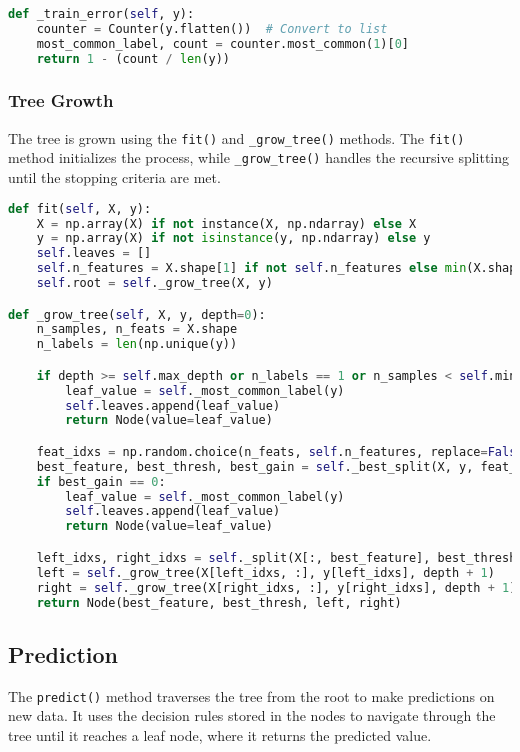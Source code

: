 \documentclass{article}
\begin{document}
\begin{lstlisting}[language=Python, caption=train error (as a split criterion)]
def _train_error(self, y):
    counter = Counter(y.flatten())  # Convert to list
    most_common_label, count = counter.most_common(1)[0]
    return 1 - (count / len(y))
\end{lstlisting}

\subsubsection{Tree Growth}
The tree is grown using the \texttt{fit()} and \texttt{\_grow\_tree()} methods. The \texttt{fit()} method initializes the process, while \texttt{\_grow\_tree()} handles the recursive splitting until the stopping criteria are met.

\begin{lstlisting}[language=Python, caption=Tree Growth Process]
def fit(self, X, y):
    X = np.array(X) if not instance(X, np.ndarray) else X
    y = np.array(X) if not isinstance(y, np.ndarray) else y       
    self.leaves = []
    self.n_features = X.shape[1] if not self.n_features else min(X.shape[1], self.n_features)
    self.root = self._grow_tree(X, y)

def _grow_tree(self, X, y, depth=0):
    n_samples, n_feats = X.shape
    n_labels = len(np.unique(y))

    if depth >= self.max_depth or n_labels == 1 or n_samples < self.min_samples_split:
        leaf_value = self._most_common_label(y)
        self.leaves.append(leaf_value)
        return Node(value=leaf_value)

    feat_idxs = np.random.choice(n_feats, self.n_features, replace=False)
    best_feature, best_thresh, best_gain = self._best_split(X, y, feat_idxs)
    if best_gain == 0:
        leaf_value = self._most_common_label(y)
        self.leaves.append(leaf_value)
        return Node(value=leaf_value)

    left_idxs, right_idxs = self._split(X[:, best_feature], best_thresh)
    left = self._grow_tree(X[left_idxs, :], y[left_idxs], depth + 1)
    right = self._grow_tree(X[right_idxs, :], y[right_idxs], depth + 1)
    return Node(best_feature, best_thresh, left, right)
\end{lstlisting}

\subsection{Prediction}
The \texttt{predict()} method traverses the tree from the root to make predictions on new data. It uses the decision rules stored in the nodes to navigate through the tree until it reaches a leaf node, where it returns the predicted value.
\end{document}
